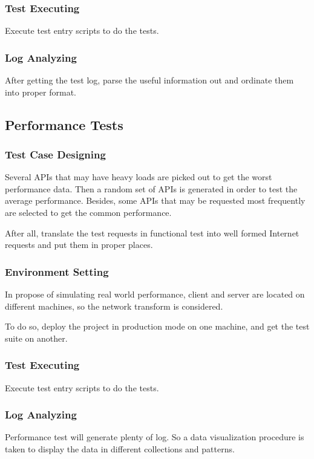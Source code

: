     \subsubsection{Test Executing}
      Execute test entry scripts to do the tests.
    \subsubsection{Log Analyzing}
      After getting the test log, parse the useful information out and ordinate them into proper format.
  \subsection{Performance Tests}
    \subsubsection{Test Case Designing}
      Several APIs that may have heavy loads are picked out to get the worst performance data.
      Then a random set of APIs is generated in order to test the average performance.
      Besides, some APIs that may be requested most frequently are selected to get the common performance.

      After all, translate the test requests in functional test into well formed Internet requests
      and put them in proper places.
    \subsubsection{Environment Setting}
      In propose of simulating real world performance,
      client and server are located on different machines, so the network transform is considered.

      To do so, deploy the project in production mode on one machine, and get the test suite on another.
    \subsubsection{Test Executing}
      Execute test entry scripts to do the tests.
    \subsubsection{Log Analyzing}
      Performance test will generate plenty of log.
      So a data visualization procedure is taken to display the data in different collections and patterns.
